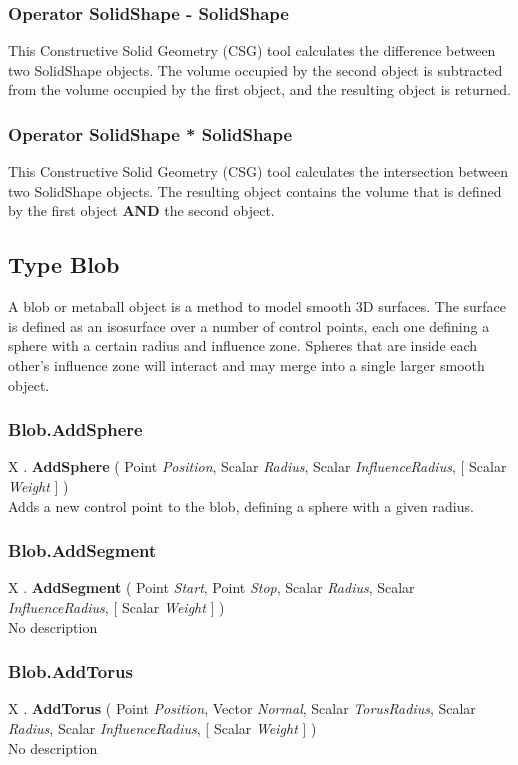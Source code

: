 \subsubsection{Operator SolidShape - SolidShape \label{O:SolidShape-SolidShape}}
This Constructive Solid Geometry (CSG) tool calculates the difference between two SolidShape objects. The volume occupied by the second object is subtracted from the volume occupied by the first object, and the resulting object is returned.

\subsubsection{Operator SolidShape * SolidShape \label{O:SolidShape*SolidShape}}
This Constructive Solid Geometry (CSG) tool calculates the intersection between two SolidShape objects. The resulting object contains the volume that is defined by the first object \textbf{AND} the second object.

\subsection{Type Blob \label{T:Blob}}
A blob or metaball object is a method to model smooth 3D surfaces. The surface is defined as an isosurface over a number of control points, each one defining a sphere with a certain radius and influence zone. Spheres that are inside each other's influence zone will interact and may merge into a single larger smooth object.

\subsubsection{Blob.AddSphere \label{F:Blob:AddSphere}}
X . \textbf{AddSphere} ( Point \textit{Position}, Scalar \textit{Radius}, Scalar \textit{InfluenceRadius},  [ Scalar \textit{Weight} ] ) \\
Adds a new control point to the blob, defining a sphere with a given radius.

\subsubsection{Blob.AddSegment \label{F:Blob:AddSegment}}
X . \textbf{AddSegment} ( Point \textit{Start}, Point \textit{Stop}, Scalar \textit{Radius}, Scalar \textit{InfluenceRadius},  [ Scalar \textit{Weight} ] ) \\
No description

\subsubsection{Blob.AddTorus \label{F:Blob:AddTorus}}
X . \textbf{AddTorus} ( Point \textit{Position}, Vector \textit{Normal}, Scalar \textit{TorusRadius}, Scalar \textit{Radius}, Scalar \textit{InfluenceRadius},  [ Scalar \textit{Weight} ] ) \\
No description

